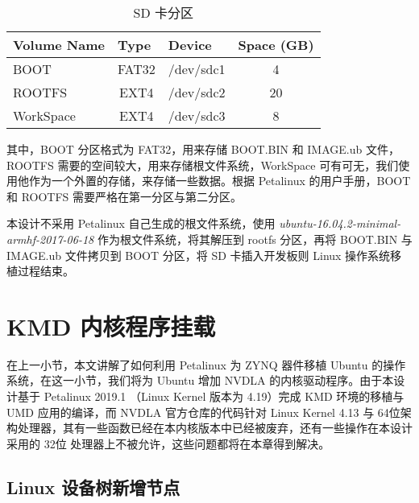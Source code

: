 \begin{table}[!htbp]
    \caption{SD 卡分区}
    \label{tab:SD Card Partition}
    \centering
    \footnotesize%
    \setlength{\tabcolsep}{4pt}%
    \renewcommand{\arraystretch}{1.2}%
    \begin{tabular}{lccc}
        \toprule
        \textbf{Volume Name} & \multicolumn{1}{l}{\textbf{Type}} & \multicolumn{1}{l}{\textbf{Device}} & \multicolumn{1}{l}{\textbf{Space (GB)}} \\
        \midrule
        BOOT                 & FAT32                             & /dev/sdc1                                & 4                                \\
        ROOTFS               & EXT4                              & /dev/sdc2                                & 20                               \\
        WorkSpace            & EXT4                              & /dev/sdc3                                & 8                                \\
        \bottomrule                   
    \end{tabular}
\end{table}

其中，BOOT 分区格式为 FAT32，用来存储 BOOT.BIN 和 IMAGE.ub 文件，ROOTFS 需要的空间较大，用来存储根文件系统，WorkSpace 可有可无，我们使用他作为一个外置的存储，来存储一些数据。根据 Petalinux 的用户手册，BOOT 和 ROOTFS 需要严格在第一分区与第二分区。

本设计不采用 Petalinux 自己生成的根文件系统，使用 \emph{ubuntu-16.04.2-minimal-armhf-2017-06-18} 作为根文件系统，将其解压到 rootfs 分区，再将 BOOT.BIN 与 IMAGE.ub 文件拷贝到 BOOT 分区，将 SD 卡插入开发板则 Linux 操作系统移植过程结束。

\section{KMD 内核程序挂载}

在上一小节，本文讲解了如何利用 Petalinux 为 ZYNQ 器件移植 Ubuntu 的操作系统，在这一小节，我们将为 Ubuntu 增加 NVDLA 的内核驱动程序。由于本设计基于 Petalinux 2019.1 （Linux Kernel 版本为 4.19）完成 KMD 环境的移植与 UMD 应用的编译，而 NVDLA 官方仓库的代码针对 Linux Kernel 4.13 与 64位架构处理器，其有一些函数已经在本内核版本中已经被废弃，还有一些操作在本设计采用的 32位 处理器上不被允许，这些问题都将在本章得到解决。

\subsection{Linux 设备树新增节点}

